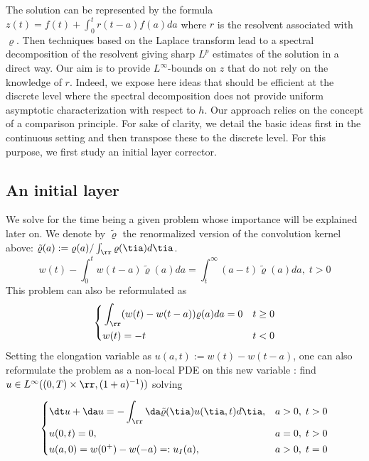 \documentclass[]{jnsao}
\newcommand{\kernel}{\varrho}
\newcommand{\tkernel}{\tilde{\varrho}}
\begin{document}
The solution can be represented by the 
formula $z(t) = f(t) + \int_0^t r(t-a) f(a) da$ 
where $r$ is the resolvent associated with $\kernel$.
Then techniques based on the Laplace transform lead to 
a spectral decomposition of the resolvent giving 
sharp $L^p$ estimates of the solution in a direct way.
Our aim is to provide $L^\infty$-bounds on $z$ that do not rely on 
the knowledge of $r$.
Indeed, we expose here ideas that should be efficient at the discrete level
where the spectral decomposition does not provide uniform asymptotic characterization
with respect to $h$. 
Our approach relies on the concept of a comparison principle.
For sake of clarity, we detail the basic ideas first in the continuous setting and then
transpose these to the discrete level.
For this purpose, we first study an initial layer corrector.

 




\subsection{An initial layer}\label{sec:initiallayer}
We solve for the time being 
a given problem whose importance will be explained later on. 
We denote by $\tkernel$ the renormalized version of the convolution kernel above:
$\tkernel (a) := \kernel(a)/ \int_\rr \kernel(\tia) d\tia$.
\begin{equation}\label{eq.w}
		 w(t)-\int_0^t w(t-a) \tkernel(a) da = \int_t^\infty \left(a-t \right) \tkernel(a) da, \;  t>0
\end{equation}
This problem can also be  reformulated as 
\begin{equation}\label{eq.L.conserved}
	\left\{
	\begin{aligned}
		& \int_\rr (w(t)-w(t-a))\kernel(a) da = 0 & t\geq 0\\
		& w(t) = -t & t< 0\\
	\end{aligned}
	\right.
\end{equation}
Setting the elongation variable as $u(a,t) := w(t)-w(t-a)$, one can 
also reformulate the problem as a non-local PDE on this new variable 
\cite{MiOel.1}: find $u \in L^\infty((0,T)\times\rr,(1+a)^{-1}))$ solving 

\begin{equation}\label{eq.elongation.u}
	\left\{
\begin{aligned}
	& \dt u + \da u = - \int_\rr \da \tkernel(\tia) u(\tia,t)d \tia, & a>0,\; t>0\\
	& u(0,t)=0, & a=0,\; t>0\\
	& u(a,0)= w(0^+) - w(-a)=:u_I(a), & a>0,\; t=0
\end{aligned}
\right.
\end{equation}
\end{document}
